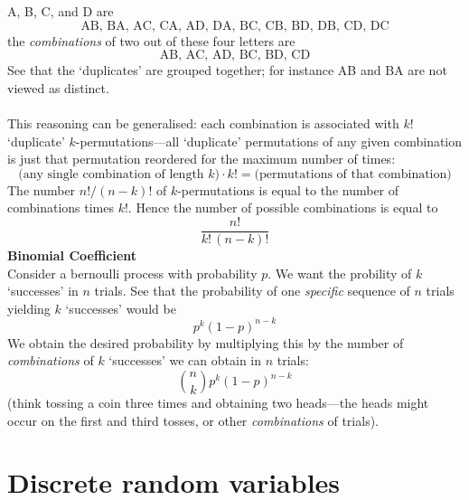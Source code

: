 \documentclass{report}
\begin{document}
A, B, C, and D are
\begin{equation*}
\text{AB, BA, AC, CA, AD, DA, BC, CB, BD, DB, CD, DC}
\end{equation*}
the \textit{combinations} of two out of these four letters are
\begin{equation*}
\text{AB, AC, AD, BC, BD, CD}
\end{equation*}
See that the `duplicates' are grouped together; for instance AB and BA are not viewed as distinct.\\
\vspace{1mm}\\
This reasoning can be generalised: each combination is associated with $k!$ `duplicate' $k$-permutations---all
`duplicate' permutations of any given combination is just
that permutation reordered for the maximum number of times:
\begin{equation*}
\text{(any single combination of length $k$)}\cdot k!=\text{(permutations of that combination)}
\end{equation*}
The number $n!/(n-k)!$ of $k$-permutations is equal to the number of combinations times $k!$. Hence the number of
possible combinations is equal to
\begin{equation*}
\frac{n!}{k!\,(n-k)!}
\end{equation*}
\textbf{Binomial Coefficient}\\
Consider a bernoulli process with probability $p$. We want the probility of $k$ `successes' in $n$ trials. 
See that the probability of one \textit{specific} sequence of $n$ trials yielding $k$ `successes' would be
\begin{equation*}
p^k(1-p)^{n-k}
\end{equation*}
We obtain the desired probability by multiplying this by the number of \textit{combinations} of $k$ `successes' we
can obtain in $n$ trials: 
\begin{equation*}
\binom{n}{k}p^k(1-p)^{n-k}
\end{equation*}
(think tossing a coin three times and obtaining two heads---the heads might occur on 
the first and third tosses, or other \textit{combinations} of trials).
\newpage

\section{Discrete random variables}
\end{document}
